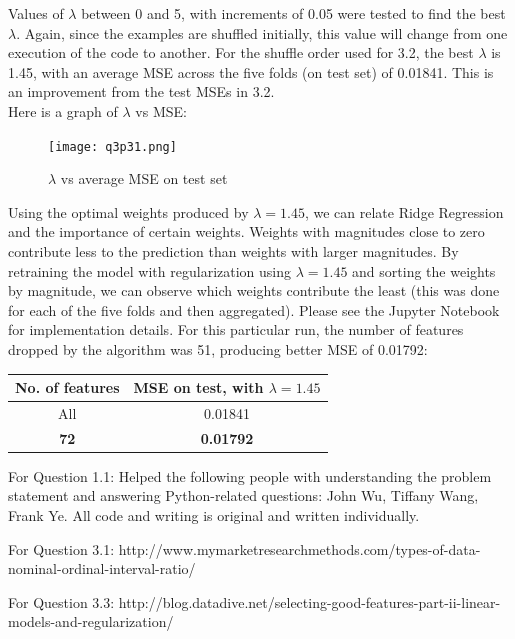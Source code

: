 \documentclass[paper=a4, fontsize=11pt]{scrartcl} %
\numberwithin{equation}{section} %
\numberwithin{figure}{section} %
\numberwithin{table}{section} %
\begin{document}
Values of \(\lambda\) between 0 and 5, with increments of 0.05 were tested to find the best \(\lambda\). Again, since the examples are shuffled initially, this value will change from one execution of the code to another. For the shuffle order used for 3.2, the best \(\lambda\) is 1.45, with an average MSE across the five folds (on test set) of 0.01841. This is an improvement from the test MSEs in 3.2. \\

Here is a graph of \(\lambda\) vs MSE:
\begin{figure}[H]
    \texttt{[image: q3p31.png]}
    \caption{\(\lambda\) vs average MSE on test set}
    \label{fig:q3p31}
\end{figure}

Using the optimal weights produced by \(\lambda = 1.45\), we can relate Ridge Regression and the importance of certain weights. Weights with magnitudes close to zero contribute less to the prediction than weights with larger magnitudes. By retraining the model with regularization using \(\lambda = 1.45\) and sorting the weights by magnitude, we can observe which weights contribute the least (this was done for each of the five folds and then aggregated). Please see the Jupyter Notebook for implementation details. For this particular run, the number of features dropped by the algorithm was 51, producing better MSE of 0.01792:

\begin{center}
\begin{tabular}{ |c|c| } 
    \hline
    \textbf{No. of features} & \textbf{MSE on test, with \(\lambda = 1.45\)} \\
    \hline
    All & 0.01841 \\
    \textbf{72} &  \textbf{0.01792} \\ 
    \hline
\end{tabular}
\end{center}

\newpage

\begin{thebibliography}{9}
For Question 1.1: Helped the following people with understanding the problem statement and answering Python-related questions: John Wu, Tiffany Wang, Frank Ye. All code and writing is original and written individually.

For Question 3.1: http://www.mymarketresearchmethods.com/types-of-data-nominal-ordinal-interval-ratio/

For Question 3.3: http://blog.datadive.net/selecting-good-features-part-ii-linear-models-and-regularization/
\end{thebibliography}
\end{document}

